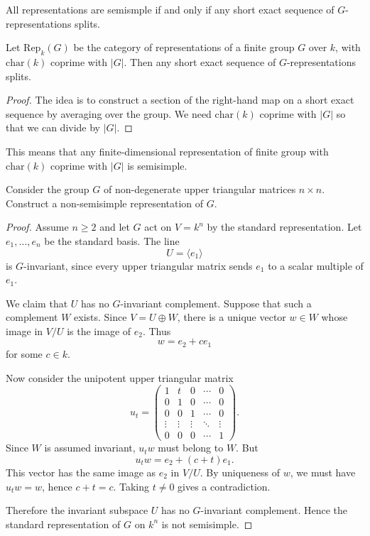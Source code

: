 \begin{remark}
\label{remark-semis-iff-any-short-exact}
All representations are semismple if and only
if
any short exact sequence of
$G$-representations splits.
\end{remark}

\begin{proposition}
\label{proposition-finit-group-have-semis}
Let $\text{Rep}_k(G)$ be the category of
representations
of a finite group $G$ over $k$,
with $\text{char}(k)$ coprime with $|G|$.
Then any short exact sequence of
$G$-representations splits.
\end{proposition}

\begin{proof}
The idea is to construct a section of the
right-hand map
on a short exact sequence by averaging over
the group.
We need $\text{char}(k)$ coprime with $|G|$
so that
we can divide by $|G|$.
\end{proof}

This means that any finite-dimensional
representation
of finite group with $\text{char}(k)$ coprime
with $|G|$
is semisimple.

\begin{exercise}
\label{exercise-nonsemisimple-borel}
Consider the group $G$ of non-degenerate
upper triangular matrices $n \times n$.
Construct a non-semisimple representation of
$G$.
\end{exercise}

\begin{proof}
Assume $n\geq 2$ and let $G$ act on
$V=k^n$ by the standard representation.
Let $e_1,\ldots,e_n$ be the standard basis.
The line
$$
U=\langle e_1\rangle
$$
is $G$-invariant, since every upper
triangular matrix sends $e_1$ to a scalar
multiple of $e_1$.

We claim that $U$ has no $G$-invariant
complement. Suppose that such a complement
$W$ exists. Since $V=U\oplus W$, there is a
unique vector $w\in W$ whose image in
$V/U$ is the image of $e_2$. Thus
$$
w=e_2+ce_1
$$
for some $c\in k$.

Now consider the unipotent upper triangular
matrix
$$
u_t=
\begin{pmatrix}
1&t&0&\cdots&0\\
0&1&0&\cdots&0\\
0&0&1&\cdots&0\\
\vdots&\vdots&\vdots&\ddots&\vdots\\
0&0&0&\cdots&1
\end{pmatrix}.
$$
Since $W$ is assumed invariant, $u_t w$ must
belong to $W$. But
$$
u_t w=e_2+(c+t)e_1.
$$
This vector has the same image as $e_2$ in
$V/U$. By uniqueness of $w$, we must have
$u_t w=w$, hence $c+t=c$. Taking
$t\neq 0$ gives a contradiction.

Therefore the invariant subspace $U$ has no
$G$-invariant complement. Hence the standard
representation of $G$ on $k^n$ is not
semisimple.
\end{proof}

